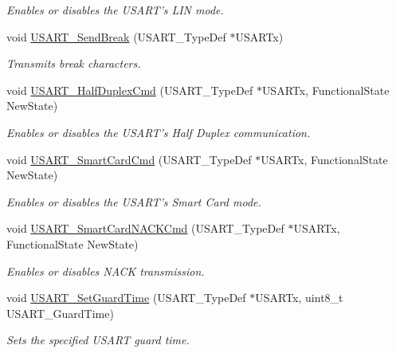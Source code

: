 \begin{DoxyCompactItemize}
\begin{DoxyCompactList}\small\item\em Enables or disables the U\-S\-A\-R\-T's L\-I\-N mode. \end{DoxyCompactList}\item 
void \hyperlink{group___u_s_a_r_t_ga39a3d33e23ee28529fa8f7259ce6811e}{U\-S\-A\-R\-T\-\_\-\-Send\-Break} (U\-S\-A\-R\-T\-\_\-\-Type\-Def $\ast$U\-S\-A\-R\-Tx)
\begin{DoxyCompactList}\small\item\em Transmits break characters. \end{DoxyCompactList}\item 
void \hyperlink{group___u_s_a_r_t_gaaa23b05fe0e1896bad90da7f82750831}{U\-S\-A\-R\-T\-\_\-\-Half\-Duplex\-Cmd} (U\-S\-A\-R\-T\-\_\-\-Type\-Def $\ast$U\-S\-A\-R\-Tx, Functional\-State New\-State)
\begin{DoxyCompactList}\small\item\em Enables or disables the U\-S\-A\-R\-T's Half Duplex communication. \end{DoxyCompactList}\item 
void \hyperlink{group___u_s_a_r_t_gabd1347e244c623447151ba3a5e986c5f}{U\-S\-A\-R\-T\-\_\-\-Smart\-Card\-Cmd} (U\-S\-A\-R\-T\-\_\-\-Type\-Def $\ast$U\-S\-A\-R\-Tx, Functional\-State New\-State)
\begin{DoxyCompactList}\small\item\em Enables or disables the U\-S\-A\-R\-T's Smart Card mode. \end{DoxyCompactList}\item 
void \hyperlink{group___u_s_a_r_t_ga62e22f47e38aa53f2edce8771f7a5dfa}{U\-S\-A\-R\-T\-\_\-\-Smart\-Card\-N\-A\-C\-K\-Cmd} (U\-S\-A\-R\-T\-\_\-\-Type\-Def $\ast$U\-S\-A\-R\-Tx, Functional\-State New\-State)
\begin{DoxyCompactList}\small\item\em Enables or disables N\-A\-C\-K transmission. \end{DoxyCompactList}\item 
void \hyperlink{group___u_s_a_r_t_gac4a35c6acd71ae7e0d67c1f03f0a8777}{U\-S\-A\-R\-T\-\_\-\-Set\-Guard\-Time} (U\-S\-A\-R\-T\-\_\-\-Type\-Def $\ast$U\-S\-A\-R\-Tx, uint8\-\_\-t U\-S\-A\-R\-T\-\_\-\-Guard\-Time)
\begin{DoxyCompactList}\small\item\em Sets the specified U\-S\-A\-R\-T guard time. \end{DoxyCompactList}\item 

\end{DoxyCompactItemize}
